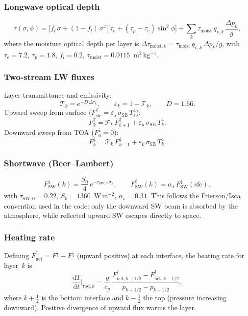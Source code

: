\documentclass[11pt,a4paper]{article}
\newcommand{\dd}{\mathrm{d}}
\newcommand{\half}{\tfrac{1}{2}}
\newcommand{\cpd}{c_p}
\newcommand{\SB}{\sigma_{\mathrm{SB}}}
\begin{document}
\subsubsection{Longwave optical depth}
\begin{equation}
  \tau(\sigma,\phi) = \bigl[f_l\,\sigma+(1-f_l)\,\sigma^4\bigr]\bigl[\tau_e+(\tau_p-\tau_e)\sin^2\!\phi\bigr]
  + \sum_k \tau_{\mathrm{moist}}\,q_{v,k}\,\frac{\Delta p_k}{g},
\end{equation}
where the moisture optical depth per layer is
$\Delta\tau_{\mathrm{moist},k}=\tau_{\mathrm{moist}}\,q_{v,k}\,\Delta p_k/g$,
with $\tau_e=7.2$, $\tau_p=1.8$, $f_l=0.2$,
$\tau_{\mathrm{moist}}=0.0115$~m$^2$\,kg$^{-1}$.

\subsubsection{Two-stream LW fluxes}
Layer transmittance and emissivity:
\begin{equation}
  \mathcal T_k = e^{-D\,\Delta\tau_k}, \qquad \varepsilon_k = 1-\mathcal T_k, \qquad D=1.66.
\end{equation}
Upward sweep from surface ($F^\uparrow_{\mathrm{sfc}}=\varepsilon_s\,\SB\,T_s^4$):
\begin{equation}
  F^\uparrow_k = \mathcal T_k\,F^\uparrow_{k+1} + \varepsilon_k\,\SB\,T_k^4.
\end{equation}
Downward sweep from TOA ($F^\downarrow_0=0$):
\begin{equation}
  F^\downarrow_k = \mathcal T_k\,F^\downarrow_{k-1} + \varepsilon_k\,\SB\,T_k^4.
\end{equation}

\subsubsection{Shortwave (Beer--Lambert)}
\begin{equation}
  F^\downarrow_{\mathrm{SW}}(k) = \frac{S_0}{4}\,e^{-\tau_{\mathrm{SW},0}\,\sigma_k}, \qquad
  F^\uparrow_{\mathrm{SW}}(k) = \alpha_s\,F^\downarrow_{\mathrm{SW}}(\mathrm{sfc}),
\end{equation}
with $\tau_{\mathrm{SW},0}=0.22$, $S_0=1360$~W\,m$^{-2}$, $\alpha_s=0.31$.
This follows the Frierson/Isca convention used in the code: only the
downward SW beam is absorbed by the atmosphere, while reflected upward
SW escapes directly to space.

\subsubsection{Heating rate}
Defining $F_{\mathrm{net}}^\uparrow=F^\uparrow-F^\downarrow$ (upward positive) at each interface, the heating rate for layer~$k$ is
\begin{equation}
  \frac{\dd T}{\dd t}\bigg|_{\mathrm{rad},k} = \frac{g}{\cpd}\,\frac{F_{\mathrm{net},k+1/2}^\uparrow-F_{\mathrm{net},k-1/2}^\uparrow}{p_{k+1/2}-p_{k-1/2}},
\end{equation}
where $k+\half$ is the bottom interface and $k-\half$ the top (pressure increasing downward).  Positive divergence of upward flux warms the layer.
\end{document}

